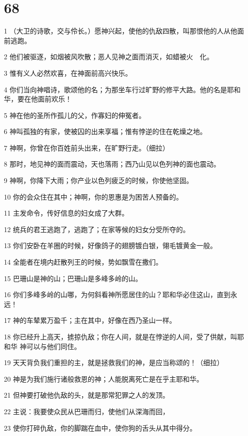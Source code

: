 \chapter{68}

\par 1 （大卫的诗歌，交与伶长。）愿神兴起，使他的仇敌四散，叫那恨他的人从他面前逃跑。
\par 2 他们被驱逐，如烟被风吹散；恶人见神之面而消灭，如蜡被火　化。
\par 3 惟有义人必然欢喜，在神面前高兴快乐。
\par 4 你们当向神唱诗，歌颂他的名；为那坐车行过旷野的修平大路。他的名是耶和华，要在他面前欢乐！
\par 5 神在他的圣所作孤儿的父，作寡妇的伸冤者。
\par 6 神叫孤独的有家，使被囚的出来享福；惟有悖逆的住在乾燥之地。
\par 7 神啊，你曾在你百姓前头出来，在旷野行走。（细拉）
\par 8 那时，地见神的面而震动，天也落雨；西乃山见以色列神的面也震动。
\par 9 神啊，你降下大雨；你产业以色列疲乏的时候，你使他坚固。
\par 10 你的会众住在其中；神啊，你的恩惠是为困苦人预备的。
\par 11 主发命令，传好信息的妇女成了大群。
\par 12 统兵的君王逃跑了，逃跑了；在家等候的妇女分受所夺的。
\par 13 你们安卧在羊圈的时候，好像鸽子的翅膀镀白银，翎毛镀黄金一般。
\par 14 全能者在境内赶散列王的时候，势如飘雪在撒们。
\par 15 巴珊山是神的山；巴珊山是多峰多岭的山。
\par 16 你们多峰多岭的山哪，为何斜看神所愿居住的山？耶和华必住这山，直到永远！
\par 17 神的车辇累万盈千；主在其中，好像在西乃圣山一样。
\par 18 你已经升上高天，掳掠仇敌；你在人间，就是在悖逆的人间，受了供献，叫耶和华 神可以与他们同住。
\par 19 天天背负我们重担的主，就是拯救我们的神，是应当称颂的！（细拉）
\par 20 神是为我们施行诸般救恩的神；人能脱离死亡是在乎主耶和华。
\par 21 但神要打破他仇敌的头，就是那常犯罪之人的发顶。
\par 22 主说：我要使众民从巴珊而归，使他们从深海而回，
\par 23 使你打碎仇敌，你的脚踹在血中，使你狗的舌头从其中得分。
